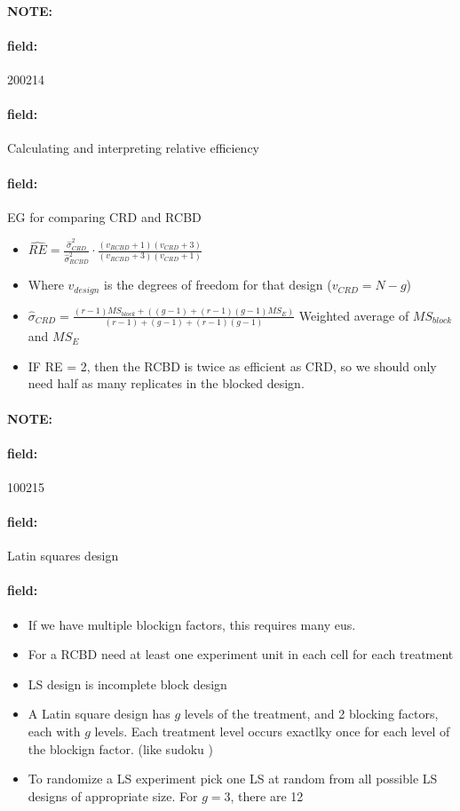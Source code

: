 \documentclass[12pt]{article}
\newenvironment{note}{\paragraph{NOTE:}}{}
\newenvironment{field}{\paragraph{field:}}{}
\begin{document}
\begin{note}
    \begin{field}
        \tiny 200214
    \end{field}
    \begin{field}
        Calculating and interpreting relative efficiency
    \end{field}
    \begin{field}
      EG for comparing CRD and RCBD
        \begin{itemize}
          \item $\widehat{RE} = \frac{\hat{\sigma}_{CRD}^2}{\hat{\sigma}^2_{RCBD}} \cdot \frac{(v_{RCBD}+1)(v_{CRD} + 3)}{(v_{RCBD}+3)(v_{CRD} + 1)}$
          \item Where $v_{design}$ is the degrees of freedom for that design ($v_{CRD} = N - g$)
          \item $\hat{\sigma}_{CRD} = \frac{(r-1)MS_{block} + ((g-1)+(r-1)(g-1)MS_E)}{(r-1) + (g-1) + (r-1)(g-1)}$ Weighted average of $MS_{block}$ and $MS_E$
          \item IF RE = 2, then the RCBD is twice as efficient as CRD, so we should only need half as many replicates in the blocked design.
        \end{itemize}
    \end{field}
\end{note}

\begin{note}
    \begin{field}
        \tiny 100215
    \end{field}
    \begin{field}
        Latin squares design
    \end{field}
    \begin{field}
        \begin{itemize}
          \item If we have multiple blockign factors, this requires many eus.
          \item For a RCBD need at least one experiment unit in each cell for each treatment
          \item LS design is incomplete block design
          \item A Latin square design has $g$ levels of the treatment, and 2 blocking factors, each with $g$ levels. Each treatment level occurs exactlky once for each level of the blockign factor. (like sudoku )
          \item To randomize a LS experiment pick one LS at random from all possible LS designs of appropriate size. For $g=3$, there are 12
        \end{itemize}
    \end{field}
\end{note}
\end{document}
